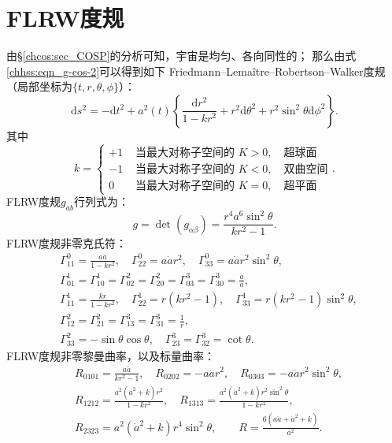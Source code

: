 \section{FLRW度规}
由\S\ref{chcos:sec_COSP}的分析可知，宇宙是均匀、各向同性的；
那么由式\eqref{chhss:eqn_g-cos-2}可以得到如下
Friedmann--Lema\^{i}tre--Robertson--Walker度规（局部坐标为$\{t,r,\theta,\phi\}$）：
\begin{equation}\label{chcos:eqn_FLRW-metric}
	\mathrm{d} s^2=-\mathrm{d} t^2+a^2(t)\left\{\frac{\mathrm{d} r^2}{1-k r^2}
	+r^2 \mathrm{d} \theta^2+r^2 \sin ^2 \theta \mathrm{d} \phi^2\right\}    .
\end{equation}
其中
\begin{equation}
	k= \begin{cases}
		+1 & \text { 当最大对称子空间的 } K>0,\quad \text{超球面} \\ 
		-1 & \text { 当最大对称子空间的 } K<0,\quad \text{双曲空间} \\ 
		0  & \text { 当最大对称子空间的 } K=0,\quad \text{超平面}
	\end{cases} .
\end{equation}
FLRW度规$g_{ab}$行列式为：
\begin{equation}\label{chcos:eqn_FLRW-detg}
	g=\det(g_{\alpha\beta})= \frac{r^4 a^6 \sin^2 \theta}{k r^2-1} .
\end{equation}
FLRW度规非零克氏符：
\begin{subequations}\label{chcos:eqn_FLRW-Gamma}
\begin{align}
	&\Gamma^{0}_{11} = \frac{a \dot{a}}{1-k r^2},\quad
	\Gamma^{0}_{22} =  a \dot{a} r^2,\quad
	\Gamma^{0}_{33} =  a \dot{a} r^2 \sin ^2\theta, \\
	&\Gamma^{1}_{01} = \Gamma^{1}_{10} = \Gamma^{2}_{02} = \Gamma^{2}_{20} = 
	\Gamma^{3}_{03} = \Gamma^{3}_{30} = \frac{\dot{a}}{a}, \\
	&\Gamma^{1}_{11} = \frac{k r}{1-k r^2},\quad
	\Gamma^{1}_{22} = r \left(k r^2-1\right),\quad
	\Gamma^{1}_{33} = r \left(k r^2-1\right) \sin ^2 \theta ,\\
	&\Gamma^{2}_{12} = \Gamma^{2}_{21} = \Gamma^{3}_{13} = \Gamma^{3}_{31} = \frac{1}{r}, \\
	&\Gamma^{2}_{33} = - \sin \theta \cos \theta ,\quad
	\Gamma^{3}_{23} = \Gamma^{3}_{32} = \cot \theta .
\end{align}
\end{subequations}
FLRW度规非零黎曼曲率，以及标量曲率：
\begin{subequations}\label{chcos:eqn_FLRW-Riemann}
\begin{align}
	&R_{0101} = \frac{a \ddot{a}}{k r^2-1} ,\quad 
	R_{0202} = - a \ddot{a} r^2,\quad
	R_{0303} = - a \ddot{a} r^2 \sin^2 \theta , \\
	&R_{1212} = \frac{ a^2 \left(\dot{a}^2+k\right)r^2}{1-k r^2}, \quad
	R_{1313} = \frac{ a^2 \left(\dot{a}^2+k\right) r^2 \sin^2\theta }{1-k r^2},\\
	&R_{2323} =  a^2 \left(\dot{a}^2+k\right) r^4 \sin^2\theta ,\qquad
	R = \frac{6 \left(a \ddot{a}+\dot{a}^2+k\right)}{a^2} .
\end{align}
\end{subequations}
